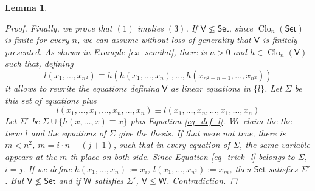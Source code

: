 \documentclass{amsart}
\theoremstyle{plain}
\newtheorem{lemma}[theorem]{Lemma}
\theoremstyle{definition}
\theoremstyle{remark}
\DeclareMathOperator{\Clo}{Clo}
\begin{document}
\begin{lemma}
\begin{proof}
        Finally, we prove that $(1)$ implies $(3)$.
        If $\mathsf{V} \nleq \mathsf{Set}$, since $\Clo_n(\mathsf{Set})$ is finite for every $n$,
        we can assume without loss of generality that $\mathsf{V}$ is finitely presented. 
        As shown in Example \ref{ex_semilat}, there is $n >0$ and $h \in \Clo_n(\mathsf{V})$ such that, defining
        \begin{equation}
            \label{eq_def_l}
            l(x_1, \ldots, x_{n^2}) \equiv h(h(x_1, \ldots, x_n), \ldots, h(x_{n^2-n+1}, \ldots, x_{n^2}))
        \end{equation}
        it allows to rewrite the equations defining $\mathsf{V}$ as linear equations in $\{l\}$.
        Let $\Sigma$ be this set of equations plus 
        \begin{equation}
            \label{eq_trick_l}
            l(x_1, \ldots, x_1, \ldots, x_n, \ldots, x_n) \equiv l(x_1, \ldots, x_n, \ldots, x_1, \ldots, x_n)
        \end{equation} 
        Let $\Sigma'$ be $\Sigma \cup \{h(x,\ldots,x) \equiv x\}$ plus Equation \eqref{eq_def_l}.
        We claim the the term $l$ and the equations of $\Sigma$ give the thesis. 
        If that were not true, there is $m < n^2$, $m=i \cdot n + (j+1)$, such that in every equation of $\Sigma$, the same variable appears at the $m$-th place on both side. 
        Since Equation \ref{eq_trick_l} belongs to $\Sigma$, $i=j$. 
        If we define $h(x_1,\ldots,x_n) :=x_i$, $l(x_1, \ldots, x_{n^2}):=x_m$, then $\mathsf{Set}$ satisfies $\Sigma'$. 
        But $\mathsf{V} \nleq \mathsf{Set}$ and if $\mathsf{W}$ satisfies $\Sigma'$, $\mathsf{V} \le \mathsf{W}$. 
        Contradiction. 
    \end{proof}
\end{lemma}
\end{document}
